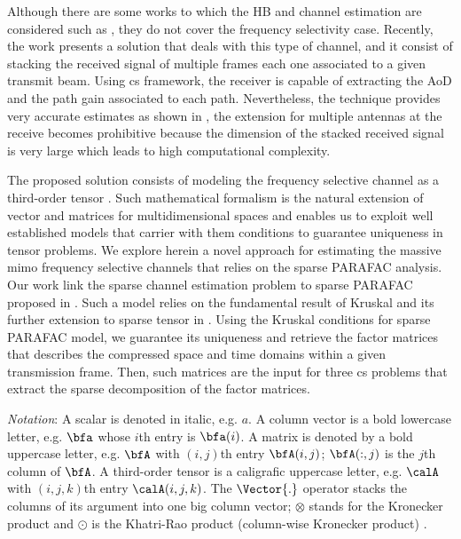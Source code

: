 \documentclass[conference]{IEEEtran}
\begin{document}
Although there are some works to which the \gls{HB} and channel estimation are considered such as
\cite{Heath:2016,Alkhateeb:2014}, they do not cover the frequency selectivity
case. Recently, the work \cite{Venugopal:2017} presents a solution that deals
with this type of channel, and it consist of stacking the received signal of
multiple frames each one associated to a given transmit beam. Using \gls{cs}
framework, the receiver is capable of extracting the \gls{AoD} and the path gain
associated to each path. Nevertheless, the technique provides very accurate
estimates as shown in \cite{Venugopal:2017},  the extension for 
multiple antennas at the receive becomes prohibitive because the dimension of the
stacked received signal is very large which leads to high computational complexity.

The proposed solution consists of modeling the frequency selective channel as a
third-order tensor \cite{Kolda:2009,Sidiropoulos:2000}. Such mathematical
formalism is the natural extension of vector and matrices for multidimensional
spaces and enables us to exploit well established models that carrier
with them conditions to guarantee uniqueness in tensor problems. We explore
herein a novel approach for estimating the massive \gls{mimo} frequency
selective channels that relies on the sparse \gls{PARAFAC} analysis. Our work
link the sparse channel estimation problem to sparse \gls{PARAFAC} proposed in
\cite{Sidiropoulos:2012}. Such a model relies on the fundamental result of
Kruskal \cite{Sidiropoulos:2000} and its further extension to sparse tensor in
\cite{Sidiropoulos:2012}. Using the Kruskal conditions for sparse \gls{PARAFAC}
model, we guarantee its uniqueness and retrieve the factor matrices
\cite{Kolda:2009} that
describes the compressed space and time domains within a given transmission
frame. Then, such matrices are the input for three \gls{cs} problems that
extract  the sparse decomposition of the factor matrices.


\textit{Notation}: A scalar is denoted in italic, e.g. $a$. A column vector is a
bold lowercase letter, e.g. $\bfa$ whose $i$th entry is $\bfa(i)$. A matrix is
denoted by a bold uppercase letter, e.g. $\bfA$ with $(i,j)$th entry
$\bfA(i,j)$; $\bfA(:,j)$ is the $j$th column of $\bfA$. A third-order tensor is
a caligrafic uppercase letter, e.g. $\calA$ with $(i,j,k)$th entry
$\calA(i,j,k)$. The $\Vector{.}$ operator stacks the columns of its argument
into one big column  vector; $\otimes$ stands for the Kronecker product and
$\odot$ is the Khatri-Rao product (column-wise Kronecker product) \cite{Sidiropoulos:2000,Sidiropoulos:2012}. 
\end{document}
